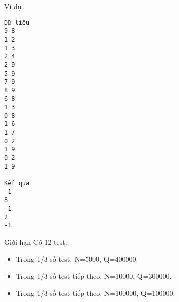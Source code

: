 Ví dụ
\begin{verbatim}
Dữ liệu
9 8
1 2
1 3
2 4
2 9
5 9
7 9
8 9
6 8
1 3
0 8
1 6
1 7
0 2
1 9
0 2
1 9 

Kết quả
-1
8
-1
2
-1
\end{verbatim}
Giới hạn
Có 12 test:
\begin{itemize}
	\item Trong 1/3 số test, N=5000, Q=400000.
	\item Trong 1/3 số test tiếp theo, N=10000, Q=300000.
	\item Trong 1/3 số test tiếp theo, N=100000, Q=100000.
\end{itemize}